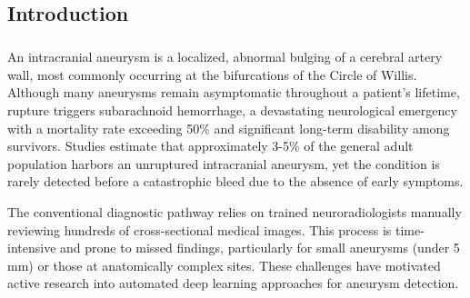 \documentclass[twoside,a4paper,openright]{report} %
\begin{document}
\pagestyle{plain} %
\pagestyle{fancy} %









\begin{flushleft}
\setcounter{page}{0}
\chapter{Introduction}
\end{flushleft}
\paragraph{}
\hspace{1.5cm}

An intracranial aneurysm is a localized, abnormal bulging of a cerebral artery wall, most commonly occurring at the bifurcations of the Circle of Willis. Although many aneurysms remain asymptomatic throughout a patient's lifetime, rupture triggers subarachnoid hemorrhage, a devastating neurological emergency with a mortality rate exceeding 50\% and significant long-term disability among survivors. Studies estimate that approximately 3-5\% of the general adult population harbors an unruptured intracranial aneurysm, yet the condition is rarely detected before a catastrophic bleed due to the absence of early symptoms.

The conventional diagnostic pathway relies on trained neuroradiologists manually reviewing hundreds of cross-sectional medical images. This process is time-intensive and prone to missed findings, particularly for small aneurysms (under 5 mm) or those at anatomically complex sites. These challenges have motivated active research into automated deep learning approaches for aneurysm detection.
\end{document}
